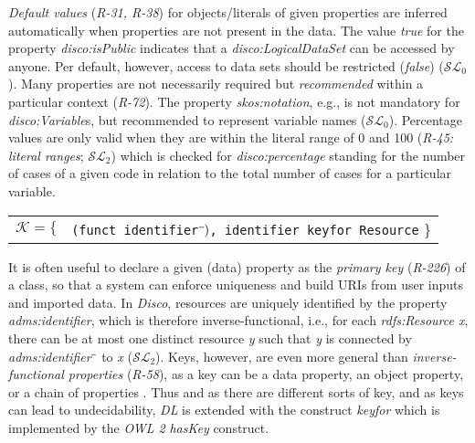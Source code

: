 \documentclass{llncs}
\newcommand{\ms}[1]{\texttt{#1}}
\newenvironment{DL}{
  \small
  \vspace{0cm}
	\begin{center}
  \begin{tabular}{c l}

}{
  \end{tabular}
	\end{center}
}
\begin{document}
{{%
\emph{Default values} (\emph{R-31, R-38}) for objects/literals of given properties are inferred automatically when properties are not present in the data.
The value \emph{true} for the property {\em disco:isPublic} indicates that a {\em disco:LogicalDataSet} can be accessed by anyone.
Per default, however, access to data sets should be restricted (\emph{false}) ($\mathcal{SL}_{0}$).
Many properties are not necessarily required but \emph{recommended} within a particular context (\emph{R-72}).
The property {\em skos:notation}, e.g., is not mandatory for {\em disco:Variable}s, but recommended to represent variable names ($\mathcal{SL}_{0}$).
Percentage values are only valid when they are within the literal range of 0 and 100 (\emph{R-45: literal ranges}; $\mathcal{SL}_{2}$)
which is checked for \emph{disco:percentage} standing for the number of cases of a given code in relation to the total number of cases for a particular variable.

\begin{center}
\begin{DL} 
$\mathcal{K}=\{$ 
	&\ms{(funct identifier$\sp{\overline{\ }})$, identifier keyfor Resource}
 \}\\ 
\end{DL}
\end{center}

It is often useful to declare a given (data) property as the \emph{primary key} (\emph{R-226}) of a class, so that a system can enforce uniqueness and build URIs from user inputs and imported data. 
In \emph{Disco}, resources are uniquely identified by the property \emph{adms:identifier},
which is therefore inverse-functional,
i.e., for each \emph{rdfs:Resource x}, there can be at most one distinct resource \emph{y} such that \emph{y} is connected by \emph{adms:identifier$\sp{\overline{\ }}$} to \emph{x} ($\mathcal{SL}_{2}$).
Keys, however, are even more general than \emph{inverse-functional properties} (\emph{R-58}),
as a key can be a data property, an object property, or a chain of properties \cite{Schneider2009}.
Thus and as there are different sorts of key, and as keys can lead to undecidability, 
\emph{DL} is extended with the construct \emph{keyfor} \cite{Lutz2005} which is implemented by the \emph{OWL 2} \emph{hasKey} construct.

}}
\end{document}
